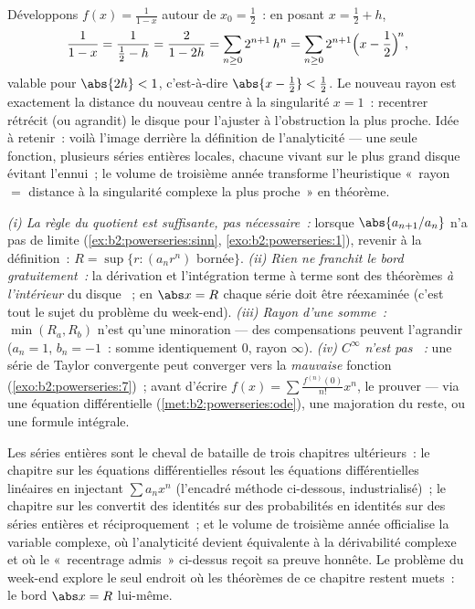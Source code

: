 \begin{example}\label{ex:b2:powerseries:recenter}
Développons $f(x) = \frac{1}{1-x}$ autour de $x_0 = \frac12$~: en
posant $x = \frac12 + h$,
\[
\frac{1}{1 - x} = \frac{1}{\frac12 - h}
= \frac{2}{1 - 2h}
= \sum_{n\geq0} 2^{n+1}\,h^n
= \sum_{n\geq0} 2^{n+1}\Bigl(x - \frac12\Bigr)^{\!n},
\]
valable pour $\abs{2h} < 1$, c'est-à-dire $\abs{x - \frac12} < \frac12$.
Le nouveau rayon est exactement la distance du nouveau centre à
la singularité $x = 1$~: recentrer rétrécit (ou agrandit) le
disque pour l'ajuster à l'obstruction la plus proche. Idée à
retenir~: voilà l'image derrière la définition de l'analyticité ---
une seule fonction, plusieurs séries entières locales, chacune vivant
sur le plus grand disque évitant l'ennui~; le volume de troisième
année transforme l'heuristique «~rayon $=$ distance à la
singularité complexe la plus proche~» en théorème.
\end{example}

\begin{remark}
\emph{(i) La règle du quotient est suffisante, pas nécessaire~:}
lorsque $\abs{a_{n+1}/a_n}$ n'a pas de limite
(\cref{ex:b2:powerseries:sinn}, \cref{exo:b2:powerseries:1}),
revenir à la définition~: $R = \sup\{r : (a_nr^n)$
bornée$\}$. \emph{(ii) Rien ne franchit le bord gratuitement~:}
la dérivation et l'intégration terme à terme sont des théorèmes
\emph{à l'intérieur} du disque ~; en $\abs x = R$ chaque série doit
être réexaminée (c'est tout le sujet du problème du week-end).
\emph{(iii) Rayon d'une somme~:} $\min(R_a, R_b)$ n'est
qu'une minoration --- des compensations peuvent l'agrandir ($a_n = 1$,
$b_n = -1$~: somme identiquement $0$, rayon $\infty$). \emph{(iv)
$C^\infty$ n'est pas ~:} une série de Taylor convergente peut
converger vers la \emph{mauvaise} fonction
(\cref{exo:b2:powerseries:7})~; avant d'écrire $f(x) = \sum
\frac{f^{(n)}(0)}{n!}x^n$, le prouver --- via une équation
différentielle (\cref{met:b2:powerseries:ode}), une majoration du
reste, ou une formule intégrale.
\end{remark}

\begin{remark}
Les séries entières sont le cheval de bataille de trois chapitres
ultérieurs~: le chapitre sur les équations différentielles résout
les équations différentielles linéaires en injectant
$\sum a_nx^n$ (l'encadré méthode ci-dessous, industrialisé)~; le
chapitre sur les  convertit des identités sur
des probabilités en identités sur des séries entières et
réciproquement~; et le volume de troisième année officialise la
variable complexe, où l'analyticité devient équivalente à la
dérivabilité complexe et où le «~recentrage admis~» ci-dessus reçoit sa
preuve honnête. Le problème du week-end explore le seul endroit où les
théorèmes de ce chapitre restent muets~: le bord $\abs x = R$
lui-même.
\end{remark}

